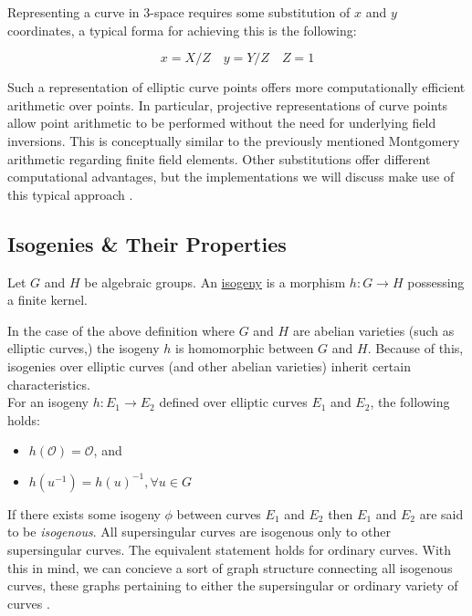 Representing a curve in 3-space requires some substitution of $x$ and $y$ coordinates, a typical forma for achieving this is the following:

$$
x = X/Z\quad
y = Y/Z\quad
Z = 1
$$

Such a representation of elliptic curve points offers more computationally efficient arithmetic over points. In particular, projective representations of curve points allow point arithmetic to be performed without the need for underlying field inversions. This is conceptually similar to the previously mentioned Montgomery arithmetic regarding finite field elements. Other substitutions offer different computational advantages, but the implementations we will discuss make use of this typical approach \cite{curvecoords}.

\subsection{Isogenies \& Their Properties}

\begin{tcolorbox}
\begin{definition}[Isogeny]
\label{defn:isogeny}
Let $G$ and $H$ be algebraic groups. An \underline{isogeny} is a morphism $h: G \rightarrow H$ possessing a finite kernel.
\end{definition}
\end{tcolorbox}

In the case of the above definition where $G$ and $H$ are abelian varieties (such as elliptic curves,) the isogeny $h$ is homomorphic between $G$ and $H$. Because of this, isogenies over elliptic curves (and other abelian varieties) inherit certain characteristics.\\
For an isogeny $h: E_{1} \rightarrow E_{2}$ defined over elliptic curves $E_1$ and $E_2$, the following holds:
\begin{itemize}
\item $h(\mathcal{O}) = \mathcal{O}$, and
\item $h(u^{-1}) = h(u)^{-1}, \forall u \in G$
\end{itemize}

If there exists some isogeny $\phi$ between curves $E_1$ and $E_2$ then $E_1$ and $E_2$ are said to be \emph{isogenous}. All supersingular curves are isogenous only to other supersingular curves. The equivalent statement holds for ordinary curves. With this in mind, we can concieve a sort of graph structure connecting all isogenous curves, these graphs pertaining to either the supersingular or ordinary variety of curves \cite{pairings}.

